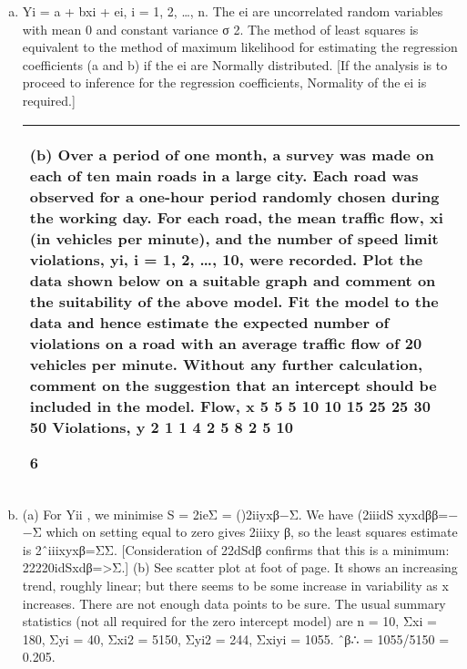 \documentclass[a4paper,12pt]{article}
\begin{document}
\begin{enumerate}[(a)]
\item Yi = a + bxi + ei, i = 1, 2, …, n.
The {ei} are uncorrelated random variables with mean 0 and constant variance σ 2.
The method of least squares is equivalent to the method of maximum likelihood for estimating the regression coefficients (a and b) if the {ei} are Normally distributed.
[If the analysis is to proceed to inference for the regression coefficients, Normality of the {ei} is required.]

\newpage


\begin{table}[ht!]
     
\centering
     
\begin{tabular}{|p{15cm}|}
     
\hline        

\noindent

(b) Over a period of one month, a survey was made on each of ten main roads in a large city. 
Each road was observed for a one-hour period randomly chosen during the working day. 
For each road, the mean traffic flow, xi (in vehicles per minute), and the number of speed limit violations, yi, i = 1, 2, …, 10, were recorded. 
Plot the data shown below on a suitable graph and comment on the suitability of the above model. 
Fit the model to the data and hence estimate the expected number of violations on a road 
with an average traffic flow of 20 vehicles per minute. Without any further calculation, comment 
on the suggestion that an intercept should be included in the model.
Flow, x
5
5
5
10
10
15
25
25
30
50
Violations, y
2
1
1
4
2
5
8
2
5
10

6
\\ \hline
      
\end{tabular}
    
\end{table}


\item (a) For Yii , we minimise S = 2ieΣ = ()2iiyxβ−Σ.
We have (2iiidS xyxdββ=−−Σ which on setting equal to zero gives 2iiixy β, so the least squares estimate is 2ˆiiixyxβ=ΣΣ.
[Consideration of 22dSdβ confirms that this is a minimum: 22220idSxdβ=>Σ.]
(b) See scatter plot at foot of page. It shows an increasing trend, roughly linear; but there seems to be some increase in variability as x increases. There are not enough data points to be sure.
The usual summary statistics (not all required for the zero intercept model) are
n = 10, Σxi = 180, Σyi = 40, Σxi2 = 5150, Σyi2 = 244, Σxiyi = 1055.
ˆβ∴ =
1055/5150 =
0.205. 


\end{enumerate}
\end{document}
